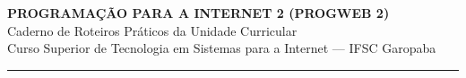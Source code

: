 \documentclass[12pt,a4paper]{article}
\begin{document}
\begin{center}
    {\Large \textbf{PROGRAMAÇÃO PARA A INTERNET 2 (PROGWEB 2)}}\\
    Caderno de Roteiros Práticos da Unidade Curricular\\
    Curso Superior de Tecnologia em Sistemas para a Internet — IFSC Garopaba
\end{center}

\vspace{0.5cm}
\hrule
\vspace{0.8cm}

\tableofcontents
\newpage


\newpage

\newpage

\newpage

\newpage

\newpage

\newpage

\end{document}

